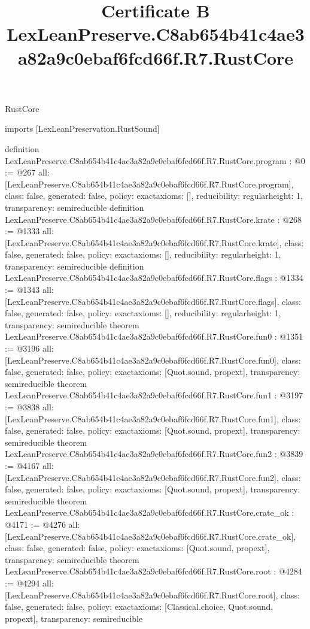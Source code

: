 \begin{lexlean}{RustCore}
\title{Certificate B LexLeanPreserve.C8ab654b41c4ae3a82a9c0ebaf6fcd66f.R7.RustCore}
\begin{coremodule}
imports [LexLeanPreservation.RustSound]

definition LexLeanPreserve.C8ab654b41c4ae3a82a9c0ebaf6fcd66f.R7.RustCore.program : @0 := @267 {
  all: [LexLeanPreserve.C8ab654b41c4ae3a82a9c0ebaf6fcd66f.R7.RustCore.program],
  class: false,
  generated: false,
  policy: exact{axioms: []},
  reducibility: regular{height: 1},
  transparency: semireducible
}
definition LexLeanPreserve.C8ab654b41c4ae3a82a9c0ebaf6fcd66f.R7.RustCore.krate : @268 := @1333 {
  all: [LexLeanPreserve.C8ab654b41c4ae3a82a9c0ebaf6fcd66f.R7.RustCore.krate],
  class: false,
  generated: false,
  policy: exact{axioms: []},
  reducibility: regular{height: 1},
  transparency: semireducible
}
definition LexLeanPreserve.C8ab654b41c4ae3a82a9c0ebaf6fcd66f.R7.RustCore.flags : @1334 := @1343 {
  all: [LexLeanPreserve.C8ab654b41c4ae3a82a9c0ebaf6fcd66f.R7.RustCore.flags],
  class: false,
  generated: false,
  policy: exact{axioms: []},
  reducibility: regular{height: 1},
  transparency: semireducible
}
theorem LexLeanPreserve.C8ab654b41c4ae3a82a9c0ebaf6fcd66f.R7.RustCore.fun0 : @1351 := @3196 {
  all: [LexLeanPreserve.C8ab654b41c4ae3a82a9c0ebaf6fcd66f.R7.RustCore.fun0],
  class: false,
  generated: false,
  policy: exact{axioms: [Quot.sound, propext]},
  transparency: semireducible
}
theorem LexLeanPreserve.C8ab654b41c4ae3a82a9c0ebaf6fcd66f.R7.RustCore.fun1 : @3197 := @3838 {
  all: [LexLeanPreserve.C8ab654b41c4ae3a82a9c0ebaf6fcd66f.R7.RustCore.fun1],
  class: false,
  generated: false,
  policy: exact{axioms: [Quot.sound, propext]},
  transparency: semireducible
}
theorem LexLeanPreserve.C8ab654b41c4ae3a82a9c0ebaf6fcd66f.R7.RustCore.fun2 : @3839 := @4167 {
  all: [LexLeanPreserve.C8ab654b41c4ae3a82a9c0ebaf6fcd66f.R7.RustCore.fun2],
  class: false,
  generated: false,
  policy: exact{axioms: [Quot.sound, propext]},
  transparency: semireducible
}
theorem LexLeanPreserve.C8ab654b41c4ae3a82a9c0ebaf6fcd66f.R7.RustCore.crate_ok : @4171 := @4276 {
  all: [LexLeanPreserve.C8ab654b41c4ae3a82a9c0ebaf6fcd66f.R7.RustCore.crate_ok],
  class: false,
  generated: false,
  policy: exact{axioms: [Quot.sound, propext]},
  transparency: semireducible
}
theorem LexLeanPreserve.C8ab654b41c4ae3a82a9c0ebaf6fcd66f.R7.RustCore.root : @4284 := @4294 {
  all: [LexLeanPreserve.C8ab654b41c4ae3a82a9c0ebaf6fcd66f.R7.RustCore.root],
  class: false,
  generated: false,
  policy: exact{axioms: [Classical.choice, Quot.sound, propext]},
  transparency: semireducible
}


\end{coremodule}
\end{lexlean}
